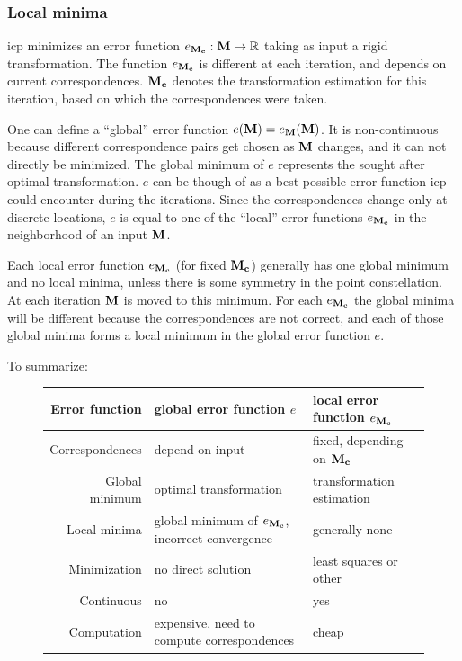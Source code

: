 \subsubsection{Local minima}
\gls{icp} minimizes an error function $e_{\mathbf{M_c}} : \mathbf{M} \mapsto \mathbb{R}$ taking as input a rigid transformation. The function $e_{\mathbf{M_c}}$ is different at each iteration, and depends on current correspondences. $\mathbf{M_c}$ denotes the transformation estimation for this iteration, based on which the correspondences were taken.

One can define a ``global'' error function $e(\mathbf{M}) = e_{\mathbf{M}}(\mathbf{M})$. It is non-continuous because different correspondence pairs get chosen as $\mathbf{M}$ changes, and it can not directly be minimized. The global minimum of $e$ represents the sought after optimal transformation. $e$ can be though of as a best possible error function \gls{icp} could encounter during the iterations. Since the correspondences change only at discrete locations, $e$ is equal to one of the ``local'' error functions $e_{\mathbf{M_c}}$ in the neighborhood of an input $\mathbf{M}$.

Each local error function $e_{\mathbf{M_c}}$ (for fixed $\mathbf{M_c}$) generally has one global minimum and no local minima, unless there is some symmetry in the point constellation. At each iteration $\mathbf{M}$ is moved to this minimum. For each $e_{\mathbf{M_c}}$ the global minima will be different because the correspondences are not correct, and each of those global minima forms a local minimum in the global error function $e$.

To summarize:
\begin{figure}[H]
\begin{tabular}{r|l|l}
Error function & global error function $e$ & local error function $e_{\mathbf{M_c}}$ \\ \hline
Correspondences & depend on input & fixed, depending on $\mathbf{M_c}$ \\
Global minimum & optimal transformation & transformation estimation \\
Local minima & global minimum of $e_{\mathbf{M_c}}$, incorrect convergence & generally none \\
Minimization & no direct solution & least squares or other \\
Continuous & no & yes \\
Computation & expensive, need to compute correspondences & cheap
\end{tabular}
\end{figure}

